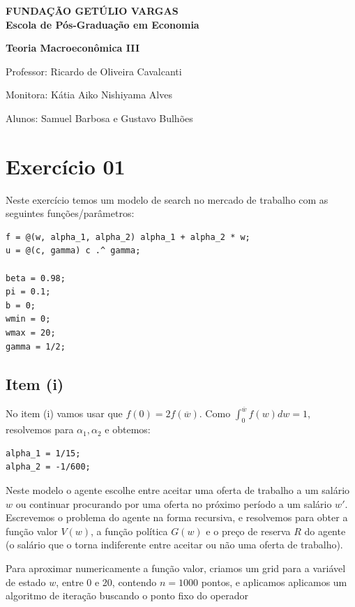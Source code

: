 \documentclass{article}
\begin{document}
\begin{flushleft}
\textbf{FUNDAÇÃO GETÚLIO VARGAS} \\

\textbf{Escola de Pós-Graduação em Economia}

\textbf{Teoria Macroeconômica III}

Professor: Ricardo de Oliveira Cavalcanti

Monitora: Kátia Aiko Nishiyama Alves

Alunos: Samuel Barbosa e Gustavo Bulhões
\end{flushleft}

\section*{Exercício 01}
Neste exercício temos um modelo de search no mercado de trabalho com as seguintes funções/parâmetros:

\begin{lstlisting}
f = @(w, alpha_1, alpha_2) alpha_1 + alpha_2 * w;
u = @(c, gamma) c .^ gamma;

beta = 0.98;
pi = 0.1;
b = 0;
wmin = 0;
wmax = 20;
gamma = 1/2;
\end{lstlisting}

\subsection*{Item (i)}

No item (i) vamos usar que $f(0) = 2f(\overline{w})$. 
Como $\int_{0}^{\overline{w}} f(w) dw = 1$, resolvemos para $\alpha_1, \alpha_2$ e obtemos:

\begin{lstlisting}
alpha_1 = 1/15;
alpha_2 = -1/600;
\end{lstlisting}

Neste modelo o agente escolhe entre aceitar uma oferta de trabalho a um salário $w$ ou 
continuar procurando por uma oferta no próximo período a um salário $w'$. 
Escrevemos o problema do agente na forma recursiva, e resolvemos para obter a função 
valor $V(w)$, a função política $G(w)$ e o preço de reserva $R$ do agente 
(o salário que o torna indiferente entre aceitar ou não uma oferta de trabalho).

Para aproximar numericamente a função valor, criamos um grid para a variável de estado $w$, 
entre 0 e 20, contendo $n = 1000$ pontos, e aplicamos aplicamos um algoritmo de iteração 
buscando o ponto fixo do operador 
\end{document}
